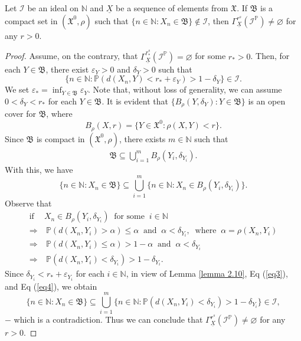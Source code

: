 \documentclass[reqno]{amsart}
\begin{document}
\begin{proposition}\label{pro2.11}
	Let $\mathcal{I}$ be an ideal on $\mathbb{N}$ and $\underline{X}$ be a sequence of elements from $\mathfrak{X}$.	If $\mathfrak{B}$ is a compact set in $(\mathfrak{X}^0, \rho)$ such that $\{n \in \mathbb{N} : X_n \in \mathfrak{B}\} \notin \mathcal{I}$, then $\Gamma^{r^s}_{\underline{X}}(\mathcal{I}^{\mathbb{P}}) \neq \varnothing$ for any $r >0$.
\end{proposition}
\begin{proof}
	Assume, on the contrary, that $\Gamma^{r_*^s}_{\underline{X}}(\mathcal{I}^{\mathbb{P}})=\varnothing$ for some $r_*>0$. Then, for each $Y\in\mathfrak{B}$, there exist $\varepsilon_Y>0$ and $\delta_Y>0$ such that 
	\begin{equation}\label{eq*}
		\{n\in\mathbb{N}:\mathbb{P}(d(X_n,Y)<r_*+\varepsilon_Y)>1-\delta_{Y}\}\in\mathcal{I}.
	\end{equation}
We set $\varepsilon_*=\displaystyle\inf_{Y\in\mathfrak{B}}\varepsilon_Y$. Note that, without loss of generality, we can assume $0<\delta_Y<r_*$ for each $Y\in\mathfrak{B}$. It is evident that $\{B_{\rho}(Y,\delta_Y):Y\in\mathfrak{B}\}$ is an open cover for $\mathfrak{B}$, where $$B_{\rho}(X,r)=\{Y\in\mathfrak{X}^0:\rho(X,Y)<r\}.$$   
	Since $\mathfrak{B}$ is compact in $(\mathfrak{X}^0, \rho)$, there exists $m\in\mathbb{N}$ such that
	\begin{align*}
		\mathfrak{B}\subseteq\bigcup_{i=1}^{m}B_{\rho}(Y_i,\delta_{Y_i}).
	\end{align*}
	With this, we have
	\begin{equation}\label{eq3}
	\{n\in\mathbb{N}:X_n\in\mathfrak{B}\}\subseteq\bigcup_{i=1}^{m}\{n\in\mathbb{N}:X_n\in B_{\rho}(Y_i,\delta_{Y_i})\}.
	\end{equation}
	Observe that
	\begin{align}\label{eq4}
		\mbox{if}~	&X_n\in  B_{\rho}(Y_i,\delta_{Y_i})~\mbox{ for some }~i\in\mathbb{N}\nonumber\\
		\Rightarrow& ~\mathbb{P}(d(X_n,Y_i)>\alpha)\leq\alpha~\mbox{ and }~\alpha<\delta_{Y_i}, ~\mbox{ where }~\alpha=\rho(X_n,Y_i)\nonumber\\
		\Rightarrow&~\mathbb{P}(d(X_n,Y_i)\leq\alpha)>1-\alpha~\mbox{ and }~\alpha<\delta_{Y_i}\nonumber\\
		\Rightarrow&~\mathbb{P}(d(X_n,Y_i)<\delta_{Y_i})>1-\delta_{Y_i}.
	\end{align}
 Since $\delta_{Y_i}<r_*+\varepsilon_{Y_i}$ for each $i\in\mathbb{N}$, in view of Lemma \ref{lemma 2.10}, Eq (\ref{eq3}), and Eq (\ref{eq4}), we obtain
		$$
		\{n\in\mathbb{N}:X_n\in\mathfrak{B}\}\subseteq\bigcup_{i=1}^{m}\{n\in\mathbb{N}:\mathbb{P}(d(X_n,Y_i)<\delta_{Y_i})>1-\delta_{Y_i}\}\in\mathcal{I},
		$$
		$-$ which is a contradiction.
Thus we can conclude that $\Gamma^{r^s}_{\underline{X}}(\mathcal{I}^{\mathbb{P}})\neq\varnothing$ for any $r>0$.
\end{proof}
\end{document}
